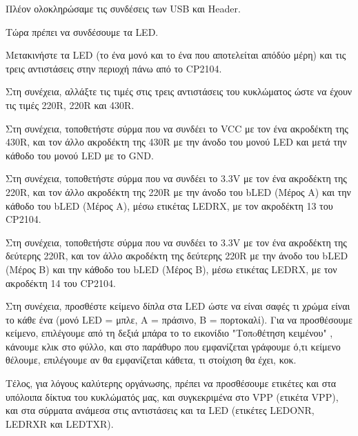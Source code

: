 \documentclass[a4paper]{article}
\begin{document}
Πλέον ολοκληρώσαμε τις συνδέσεις των USB και Header.

Τώρα πρέπει να συνδέσουμε τα \textenglish{LED}. 

Μετακινήστε τα \textenglish{LED} (το ένα μονό και το ένα που αποτελείται απόδύο μέρη) και τις τρεις αντιστάσεις στην περιοχή πάνω από το \textenglish{CP2104}.

Στη συνέχεια, αλλάξτε τις τιμές στις τρεις αντιστάσεις του κυκλώματος ώστε να έχουν τις τιμές 220R, 220R και 430R.

Στη συνέχεια, τοποθετήστε σύρμα που να συνδέει το VCC με τον ένα ακροδέκτη της 430R, και τον άλλο ακροδέκτη της 430R με την άνοδο του μονού \textenglish{LED} και μετά την κάθοδο του μονού \textenglish{LED} με το GND.

Στη συνέχεια, τοποθετήστε σύρμα που να συνδέει το 3.3V με τον ένα ακροδέκτη της 220R, και τον άλλο ακροδέκτη της 220R με την άνοδο του b\textenglish{LED} (Μέρος Α) και την κάθοδο του b\textenglish{LED} (Μέρος Α), μέσω ετικέτας \textenglish{LED}RX, με τον ακροδέκτη 13 του \textenglish{CP2104}.

Στη συνέχεια, τοποθετήστε σύρμα που να συνδέει το 3.3V με τον ένα ακροδέκτη της δεύτερης 220R, και τον άλλο ακροδέκτη της δεύτερης 220R με την άνοδο του b\textenglish{LED} (Μέρος Β) και την κάθοδο του b\textenglish{LED} (Μέρος Β), μέσω ετικέτας \textenglish{LED}RX, με τον ακροδέκτη 14 του \textenglish{CP2104}.

Στη συνέχεια, προσθέστε κείμενο δίπλα στα \textenglish{LED} ώστε να είναι σαφές τι χρώμα είναι το κάθε ένα (μονό \textenglish{LED} = μπλε, A = πράσινο, B = πορτοκαλί). Για να προσθέσουμε κείμενο, επιλέγουμε από τη δεξιά μπάρα το το εικονίδιο "Τοπoθέτηση κειμένου" %
, κάνουμε κλικ στο φύλλο, και στο παράθυρο που εμφανίζεται γράφουμε ό,τι κείμενο θέλουμε, επιλέγουμε αν θα εμφανίζεται κάθετα, τι στοίχιση θα έχει, κοκ.

\begin{figure}
  \begin{center}
    \label{fig:kicad-main}
  \end{center}
\end{figure}

Τέλος, για λόγους καλύτερης οργάνωσης, πρέπει να προσθέσουμε ετικέτες και στα υπόλοιπα δίκτυα του κυκλώματός μας, και συγκεκριμένα στο VPP (ετικέτα VPP), και στα σύρματα ανάμεσα στις αντιστάσεις και τα \textenglish{LED} (ετικέτες \textenglish{LED}ONR, \textenglish{LED}RXR και \textenglish{LED}TXR).
\end{document}
